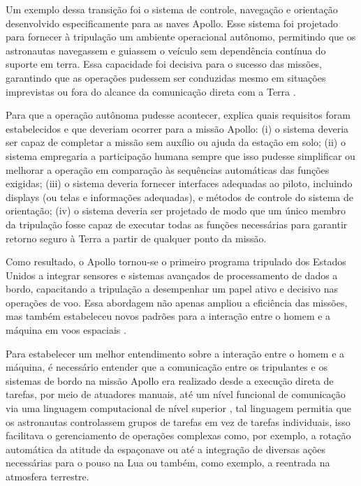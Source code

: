 Um exemplo dessa transição foi o sistema de controle, navegação e orientação desenvolvido especificamente para as naves Apollo. Esse sistema foi projetado para fornecer à tripulação um ambiente operacional autônomo, permitindo que os astronautas navegassem e guiassem o veículo sem dependência contínua do suporte em terra. Essa capacidade foi decisiva para o sucesso das missões, garantindo que as operações pudessem ser conduzidas mesmo em situações imprevistas ou fora do alcance da comunicação direta com a Terra \cite{nevins1971}.

Para que a operação autônoma pudesse acontecer, \cite{nevins1971} explica quais requisitos foram estabelecidos e que deveriam ocorrer para a missão Apollo: (i) o sistema deveria ser capaz de completar a missão sem auxílio ou ajuda da estação em solo; (ii) o sistema empregaria a participação humana sempre que isso pudesse simplificar ou melhorar a operação em comparação às sequências automáticas das funções exigidas; (iii) o sistema deveria fornecer interfaces adequadas ao piloto, incluindo displays (ou telas e informações adequadas), e métodos de controle do sistema de orientação; (iv) o sistema deveria ser projetado de modo que um único membro da tripulação fosse capaz de executar todas as funções necessárias para garantir retorno seguro à Terra a partir de qualquer ponto da missão.

Como resultado, o Apollo tornou-se o primeiro programa tripulado dos Estados Unidos a integrar sensores e sistemas avançados de processamento de dados a bordo, capacitando a tripulação a desempenhar um papel ativo e decisivo nas operações de voo. Essa abordagem não apenas ampliou a eficiência das missões, mas também estabeleceu novos padrões para a interação entre o homem e a máquina em voos espaciais \cite{nevins1971}.

Para estabelecer um melhor entendimento sobre a interação entre o homem e a máquina, é necessário entender que a comunicação entre os tripulantes e os sistemas de bordo na missão Apollo era realizado desde a execução direta de tarefas, por meio de atuadores manuais, até um nível funcional de comunicação via uma linguagem computacional de nível superior \cite{nevins1971}, tal linguagem permitia que os astronautas controlassem grupos de tarefas em vez de tarefas individuais, isso facilitava o gerenciamento de operações complexas como, por exemplo, a rotação automática da atitude da espaçonave ou até a integração de diversas ações necessárias para o pouso na Lua ou também, como exemplo, a reentrada na atmosfera terrestre.

